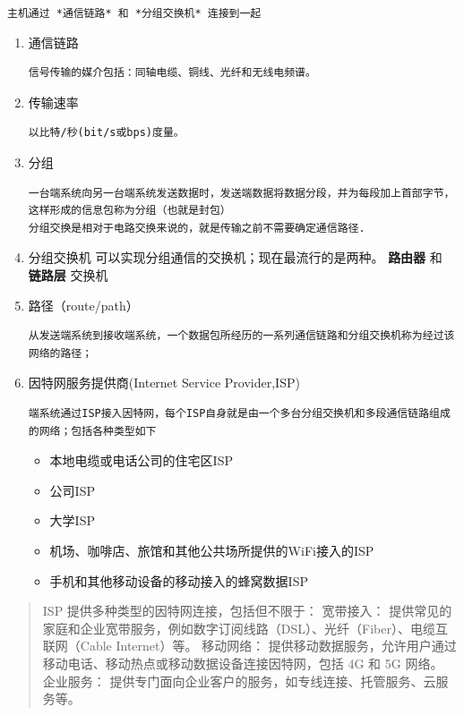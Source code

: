 \documentclass[11pt]{article}
\begin{document}
\texttt{主机通过 *通信链路* 和 *分组交换机* 连接到一起}

\begin{enumerate}
\item 通信链路
\begin{verbatim}
信号传输的媒介包括：同轴电缆、铜线、光纤和无线电频谱。
\end{verbatim}
\item 传输速率
\begin{verbatim}
以比特/秒(bit/s或bps)度量。
\end{verbatim}
\item 分组
\begin{verbatim}
一台端系统向另一台端系统发送数据时，发送端数据将数据分段，并为每段加上首部字节，这样形成的信息包称为分组（也就是封包）
分组交换是相对于电路交换来说的，就是传输之前不需要确定通信路径.
\end{verbatim}
\item 分组交换机
可以实现分组通信的交换机；现在最流行的是两种。 \textbf{路由器}  和 \textbf{链路层} 交换机
\item 路径（route/path）
\begin{verbatim}
从发送端系统到接收端系统，一个数据包所经历的一系列通信链路和分组交换机称为经过该网络的路径；
\end{verbatim}
\item 因特网服务提供商(Internet Service Provider,ISP)
\begin{verbatim}
端系统通过ISP接入因特网，每个ISP自身就是由一个多台分组交换机和多段通信链路组成的网络；包括各种类型如下
\end{verbatim}

\begin{itemize}
\item 本地电缆或电话公司的住宅区ISP
\item 公司ISP
\item 大学ISP
\item 机场、咖啡店、旅馆和其他公共场所提供的WiFi接入的ISP
\item 手机和其他移动设备的移动接入的蜂窝数据ISP
\end{itemize}
\end{enumerate}
\begin{quote}
ISP 提供多种类型的因特网连接，包括但不限于：
宽带接入： 提供常见的家庭和企业宽带服务，例如数字订阅线路（DSL）、光纤（Fiber）、电缆互联网（Cable Internet）等。
移动网络： 提供移动数据服务，允许用户通过移动电话、移动热点或移动数据设备连接因特网，包括 4G 和 5G 网络。
企业服务： 提供专门面向企业客户的服务，如专线连接、托管服务、云服务等。
\end{quote}
\end{document}
